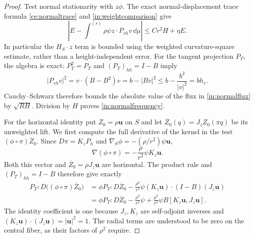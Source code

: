 \begin{proof}
Test normal stationarity with $z\phi$.  The exact normal-displacement trace formula
\eqref{ce:normaltrace} and \eqref{in:weightcomparison} give
\begin{equation}\label{in:normalflux}
 \left|E-\int^{(r)}\rho\psi
                     z\cdot P_{vh}v\,\dd\mu\right|
       \leq Cr^2H+\eta E.
\end{equation}
In particular the $H_S\cdot z$ term is bounded using the weighted
curvature-square estimate, rather than a height-independent error.
For the tangent projection $P_T$, the algebra is exact: $P_T^2=P_T$
and $(P_T)_{hh}=I-B$
imply
\[
 |P_{vh}v|^2=v\cdot(B-B^2)v
       =b-|Bv|^2
       \leq b-\frac{b^2}{|v|^2}=bh_r.
\]
Cauchy--Schwarz therefore bounds the absolute value of the flux in
\eqref{in:normalflux} by $\sqrt{RH}$.  Division by $H$ proves
\eqref{in:normalfrequency}.

For the horizontal identity put $Z_0=\rho\mathbf u$ on $S$ and let
$\overline Z_0(q)=J_zZ_0(\pi q)$ be its unweighted lift.  We first
compute the full derivative of the kernel in the test
$(\phi\circ\pi)\overline Z_0$.  Since $D\pi=K_zP_h$ and
$\nabla_S\phi=-(\rho/r^2)\psi\mathbf u$,
\[
 \nabla(\phi\circ\pi)=-\frac{\rho}{r^2}\psi K_z\mathbf u.
\]
Both this vector and $\overline Z_0=\rho J_z\mathbf u$ are horizontal.
The product rule and $(P_T)_{hh}=I-B$ therefore give exactly
\[
 \begin{split}
 P_T:D\bigl((\phi\circ\pi)\overline Z_0\bigr)
 &=\phi P_T:D\overline Z_0
   -\frac{\rho^2}{r^2}\psi
       (K_z\mathbf u)\cdot(I-B)(J_z\mathbf u)\\
 &=\phi P_T:D\overline Z_0-\frac{\rho^2}{r^2}\psi
   +\frac{\rho^2}{r^2}\psi B[K_z\mathbf u,J_z\mathbf u].
 \end{split}
\]
The identity coefficient is one because $J_z,K_z$ are self-adjoint
inverses and $(K_z\mathbf u)\cdot(J_z\mathbf u)=|\mathbf u|^2=1$.
The radial terms are understood to be zero on the central fiber, as
their factors of $\rho^2$ require.


\end{proof}
